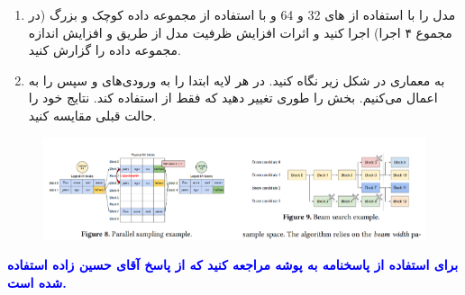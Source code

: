 \documentclass[12pt]{article}
\begin{document}
\begin{enumerate}
\begin{enumerate}
    \item مدل  را با استفاده از   های 32 و 64 و با استفاده از مجموعه داده کوچک و بزرگ (در مجموع ۴ اجرا) اجرا کنید و اثرات افزایش ظرفیت مدل از طریق  و افزایش اندازه مجموعه داده را گزارش کنید.
    \item به معماری  در شکل زیر نگاه کنید. در هر لایه ابتدا  را به ورودی‌های  و سپس  را به  اعمال می‌کنیم.  بخش  را طوری تغییر دهید که فقط از  استفاده کند. نتایج خود را حالت قبلی مقایسه کنید.
    \end{enumerate}
    \begin{figure}[h]  
            \centering
            \includegraphics[width=\textwidth]{figs/Q1_3.png}
            \label{fig:num_pic}  
        \end{figure}
    \textcolor{blue}{\textbf{برای استفاده از پاسخنامه به پوشه  مراجعه کنید که از پاسخ آقای حسین زاده استفاده شده است.}}

\end{enumerate}
\end{document}

